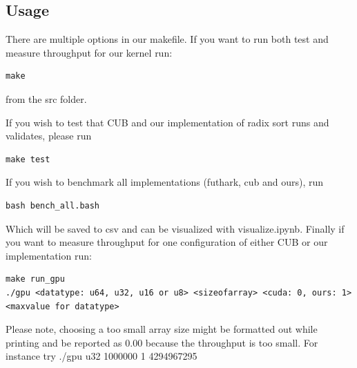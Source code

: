 \documentclass{article}
\begin{document}
\subsection{Usage}


There are multiple options in our makefile. If you want to run both test and measure throughput for our kernel run:
\begin{lstlisting}
make
\end{lstlisting}
from the src folder.

If you wish to test that CUB and our implementation of radix sort runs and validates, please run
\begin{lstlisting}
make test
\end{lstlisting}

If you wish to benchmark all implementations (futhark, cub and ours), run 
\begin{lstlisting}
bash bench_all.bash
\end{lstlisting}

Which will be saved to csv and can be visualized with visualize.ipynb.
Finally if you want to measure throughput for one configuration of either CUB or our implementation run:
\begin{lstlisting}
make run_gpu
./gpu <datatype: u64, u32, u16 or u8> <sizeofarray> <cuda: 0, ours: 1> <maxvalue for datatype>
\end{lstlisting}
Please note, choosing a too small array size might be formatted out while printing and be reported as 0.00 because the throughput is too small. For instance try ./gpu u32 1000000 1 4294967295





\end{document}
